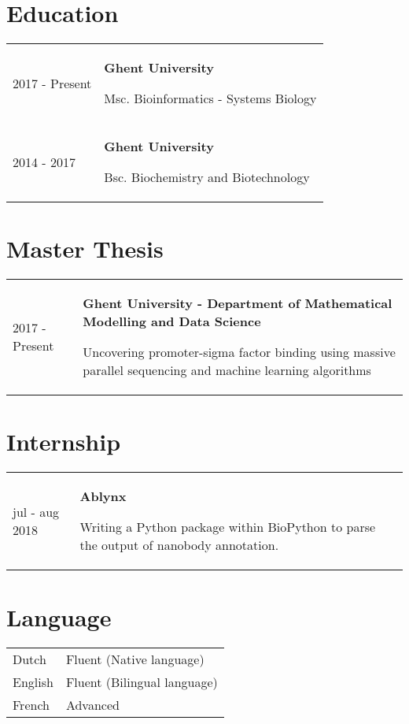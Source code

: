 \documentclass{article}
\begin{document}
\section{Education}
\begin{tabular}{ p{2.3cm} p{12cm} }
    2017 - Present & \textbf{Ghent University}

    Msc. Bioinformatics - Systems Biology \\

    2014 - 2017 & \textbf{Ghent University}
    
    Bsc. Biochemistry and Biotechnology \\
\end{tabular}

\section{Master Thesis}
\begin{tabular}{ p{2.3cm} p{12cm}}
    2017 - Present & \textbf{Ghent University - Department of Mathematical Modelling and Data Science}

    Uncovering promoter-sigma factor binding using massive parallel sequencing and machine learning algorithms \\
\end{tabular}

\section{Internship}
\begin{tabular}{ p{2.3cm} p{12cm} }
    jul - aug 2018 & \textbf{Ablynx}
    
    Writing a Python package within BioPython to parse the output of nanobody annotation.
\end{tabular}

\section{Language}
\begin{tabular}{ p{2.3cm} p{12cm} }
    Dutch & Fluent (Native language) \\
    English & Fluent (Bilingual language) \\
    French & Advanced \\
\end{tabular}
\end{document}
